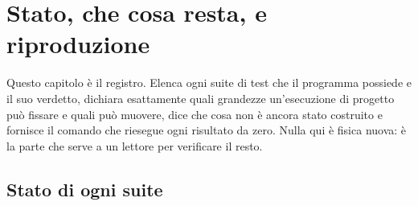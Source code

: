 \chapter{Stato, che cosa resta, e riproduzione}
\label{ch:status}

Questo capitolo è il registro. Elenca ogni suite di test che il
programma possiede e il suo verdetto, dichiara esattamente quali
grandezze un'esecuzione di progetto può fissare e quali può muovere,
dice che cosa non è ancora stato costruito e fornisce il comando che
riesegue ogni risultato da zero. Nulla qui è fisica nuova: è la parte
che serve a un lettore per verificare il resto.

\section{Stato di ogni suite}

